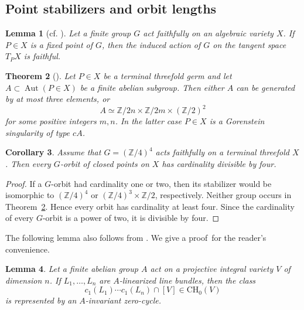 \documentclass[10pt,oneside,reqno]{amsart}
\numberwithin{equation}{section}
\newtheorem{theorem}{Theorem}[section]
\newtheorem{lemma}[theorem]{Lemma}
\newtheorem{corollary}[theorem]{Corollary}
\theoremstyle{definition}
\newcommand{\Z}{\mathbb Z}
\newcommand{\Aut}{\operatorname{Aut}}
\begin{document}
\subsection{Point stabilizers and orbit lengths}
\begin{lemma}[cf. {\cite[Lemma 4]{Po14}}]
\label{lem-faithful-action}
Let a finite group $G$ act faithfully on an algebraic variety $X$.
If $P\in X$ is a fixed point of $G$, then the induced action of $G$ on the
tangent space $T_PX$ is faithful.
\end{lemma}
\begin{theorem}[{\cite[Theorem 7.3]{LoginovProduct}}]
\label{thm-local}
Let $P\in X$ be a terminal threefold germ and let
$A\subset\Aut(P\in X)$ be a finite abelian subgroup.  Then either $A$
can be generated by at most three elements, or
\[
 A\simeq\Z/2n\times\Z/2m\times (\Z/2)^2
\]
for some positive integers $m,n$.  In the latter case $P\in X$ is a
Gorenstein singularity of type $cA$.
\end{theorem}

\begin{corollary}
\label{lem-orbits}
Assume that $G=(\Z/4)^4$ acts faithfully on a terminal threefold $X$. Then every $G$-orbit of closed points on $X$ has cardinality
divisible by four.
\end{corollary}

\begin{proof}
If a $G$-orbit had cardinality one or two, then its stabilizer would be
isomorphic to $(\Z/4)^4$ or $(\Z/4)^3\times\Z/2$, respectively.
Neither group occurs in Theorem~\ref{thm-local}. Hence every orbit has cardinality at least four.
Since the cardinality of every $G$-orbit is a power of two, it is divisible by four.
\end{proof}

The following lemma also follows from
\cite[Proposition~4.3]{Haution}. We give a proof for the reader's convenience.

\begin{lemma}
\label{lem-invariant-zero-cycle}
Let a finite abelian group $A$ act on a projective integral variety $V$
of dimension $n$.  If $L_1,\ldots,L_n$ are $A$-linearized line bundles,
then the class
\[
 c_1(L_1)\cdots c_1(L_n)\cap[V]\in\mathrm{CH}_0(V)
\]
is represented by an $A$-invariant zero-cycle.
\end{lemma}
\end{document}
